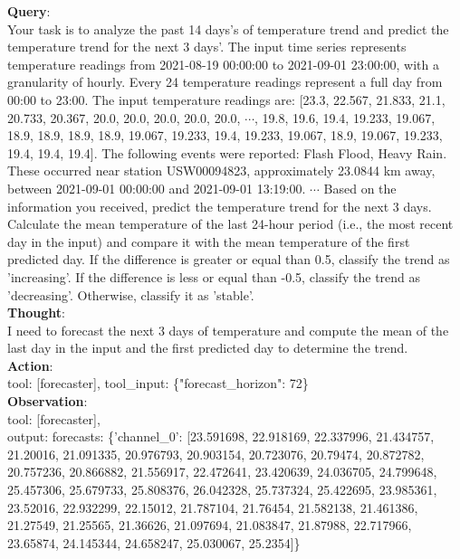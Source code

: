 \clearpage
\begin{tcolorbox}[
  colback=white,
  colframe=black!50,
  boxrule=0.3mm,
  width=\textwidth,
  rounded corners,
  title=Sample 3: Compound task,
  fonttitle=\bfseries,
  left=2mm, right=2mm, top=2mm, bottom=2mm
]
\textbf{Query}:\\
Your task is to analyze the past 14 days's of temperature trend and predict the temperature trend for the next 3 days'. The input time series represents temperature readings from 2021-08-19 00:00:00 to 2021-09-01 23:00:00, with a granularity of hourly. Every 24 temperature readings represent a full day from 00:00 to 23:00. The input temperature readings are: [23.3, 22.567, 21.833, 21.1, 20.733, 20.367, 20.0, 20.0, 20.0, 20.0, 20.0, $\cdots$, 19.8, 19.6, 19.4, 19.233, 19.067, 18.9, 18.9, 18.9, 18.9, 19.067, 19.233, 19.4, 19.233, 19.067, 18.9, 19.067, 19.233, 19.4, 19.4, 19.4]. The following events were reported: Flash Flood, Heavy Rain. These occurred near station USW00094823, approximately 23.0844 km away, between 2021-09-01 00:00:00 and 2021-09-01 13:19:00. $\cdots$ Based on the information you received, predict the temperature trend for the next 3 days. Calculate the mean temperature of the last 24-hour period (i.e., the most recent day in the input) and compare it with the mean temperature of the first predicted day. If the difference is greater or equal than 0.5, classify the trend as 'increasing'. If the difference is less or equal than -0.5, classify the trend as 'decreasing'. Otherwise, classify it as 'stable'.\\

\textbf{Thought}:\\
I need to forecast the next 3 days of temperature and compute the mean of the last day in the input and the first predicted day to determine the trend.\\

\textbf{Action}:\\
tool: [forecaster], tool\_input: \{"forecast\_horizon": 72\} \\

\textbf{Observation}: \\
tool: [forecaster], 
\\
output: forecasts: \{'channel\_0': [23.591698, 22.918169, 22.337996, 21.434757, 21.20016, 21.091335, 20.976793, 20.903154, 20.723076, 20.79474, 20.872782, 20.757236, 20.866882, 21.556917, 22.472641, 23.420639, 24.036705, 24.799648, 25.457306, 25.679733, 25.808376, 26.042328, 25.737324, 25.422695, 23.985361, 23.52016, 22.932299, 22.15012, 21.787104, 21.76454, 21.582138, 21.461386, 21.27549, 21.25565, 21.36626, 21.097694, 21.083847, 21.87988, 22.717966, 23.65874, 24.145344, 24.658247, 25.030067, 25.2354]\} \\


\end{tcolorbox}
